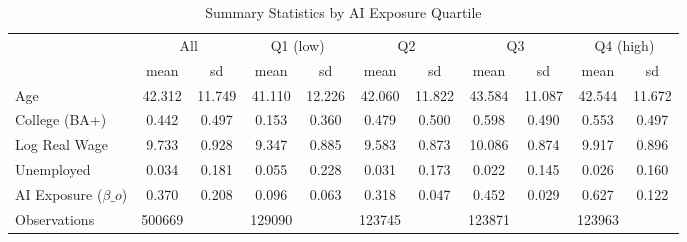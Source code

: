 \begin{table}[htbp]\centering
\def\sym#1{\ifmmode^{#1}\else\(^{#1}\)\fi}
\caption{Summary Statistics by AI Exposure Quartile}
\begin{tabular}{l*{5}{cc}}
\toprule
                    &\multicolumn{2}{c}{All}  &\multicolumn{2}{c}{Q1 (low)}&\multicolumn{2}{c}{Q2}   &\multicolumn{2}{c}{Q3}   &\multicolumn{2}{c}{Q4 (high)}\\
                    &        mean&          sd&        mean&          sd&        mean&          sd&        mean&          sd&        mean&          sd\\
\midrule
Age                 &      42.312&      11.749&      41.110&      12.226&      42.060&      11.822&      43.584&      11.087&      42.544&      11.672\\
College (BA+)       &       0.442&       0.497&       0.153&       0.360&       0.479&       0.500&       0.598&       0.490&       0.553&       0.497\\
Log Real Wage       &       9.733&       0.928&       9.347&       0.885&       9.583&       0.873&      10.086&       0.874&       9.917&       0.896\\
Unemployed          &       0.034&       0.181&       0.055&       0.228&       0.031&       0.173&       0.022&       0.145&       0.026&       0.160\\
AI Exposure ($\beta\_o$)&       0.370&       0.208&       0.096&       0.063&       0.318&       0.047&       0.452&       0.029&       0.627&       0.122\\
\midrule
Observations        &      500669&            &      129090&            &      123745&            &      123871&            &      123963&            \\
\bottomrule
\end{tabular}
\end{table}
